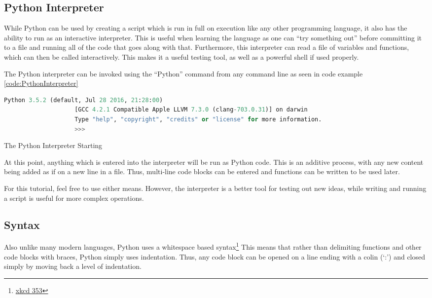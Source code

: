		\subsection{Python Interpreter}
			While Python can be used by creating a script which is run in full on execution like any other programming language,
			it also has the ability to run as an interactive interpreter. 
			This is useful when learning the language as one can ``try something out'' before committing it to a file and running all of the code that goes along with that. 
			Furthermore, this interpreter can read a file of variables and functions, which can then be called interactively. 
			This makes it a useful testing tool, as well as a powerful shell if used properly. 

			The Python interpreter can be invoked using the ``Python'' command from any command line as seen in code example \ref{code:PythonInterpreter}
			\begin{code}
				\begin{lstlisting}[language=Python,gobble=20]
					Python 3.5.2 (default, Jul 28 2016, 21:28:00)
					[GCC 4.2.1 Compatible Apple LLVM 7.3.0 (clang-703.0.31)] on darwin
					Type "help", "copyright", "credits" or "license" for more information.
					>>> 
				\end{lstlisting}
				\caption{The Python Interpreter Starting}
				\label{code:PythonInterpreter}
			\end{code}

			At this point, anything which is entered into the interpreter will be run as Python code. 
			This is an additive process, with any new content being added as if on a new line in a file. 
			Thus, multi-line code blocks can be entered and functions can be written to be used later. 

			For this tutorial, feel free to use either means. 
			However, the interpreter is a better tool for testing out new ideas, while writing and running a script is useful for more complex operations. 
		\subsection{Syntax}
			Also unlike many modern languages, Python uses a whitespace based syntax\footnote{\href{https://www.xkcd.com/353/}{xkcd 353}}
			This means that rather than delimiting functions and other code blocks with braces, Python simply uses indentation. 
			Thus, any code block can be opened on a line ending with a colin (`:') and closed simply by moving back a level of indentation. 

